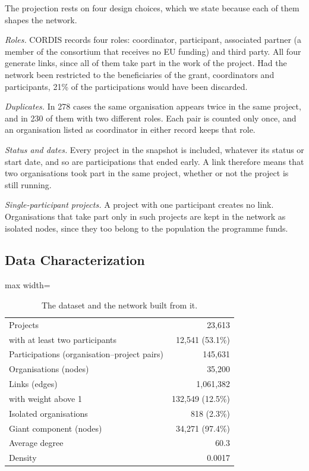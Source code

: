 \documentclass[sigchi]{acmart}
\begin{document}
The projection rests on four design choices, which we state because each of them shapes the network.

\emph{Roles.} CORDIS records four roles: coordinator, participant, associated partner (a member of the consortium that receives no EU funding) and third party. All four generate links, since all of them take part in the work of the project. Had the network been restricted to the beneficiaries of the grant, coordinators and participants, 21\% of the participations would have been discarded.

\emph{Duplicates.} In 278 cases the same organisation appears twice in the same project, and in 230 of them with two different roles. Each pair is counted only once, and an organisation listed as coordinator in either record keeps that role.

\emph{Status and dates.} Every project in the snapshot is included, whatever its status or start date, and so are participations that ended early. A link therefore means that two organisations took part in the same project, whether or not the project is still running.

\emph{Single-participant projects.} A project with one participant creates no link. Organisations that take part only in such projects are kept in the network as isolated nodes, since they too belong to the population the programme funds.

\subsection{Data Characterization}

\begin{table}[t]
\caption{The dataset and the network built from it.}
\label{tab:data}
\small
\setlength{\tabcolsep}{4pt}
\begin{adjustbox}{max width=\columnwidth}
\begin{tabular}{lr}
\toprule
Projects & 23,613 \\
\quad with at least two participants & 12,541 (53.1\%) \\
Participations (organisation--project pairs) & 145,631 \\
Organisations (nodes) & 35,200 \\
Links (edges) & 1,061,382 \\
\quad with weight above 1 & 132,549 (12.5\%) \\
Isolated organisations & 818 (2.3\%) \\
Giant component (nodes) & 34,271 (97.4\%) \\
Average degree & 60.3 \\
Density & 0.0017 \\
\bottomrule
\end{tabular}
\end{adjustbox}
\end{table}
\end{document}
